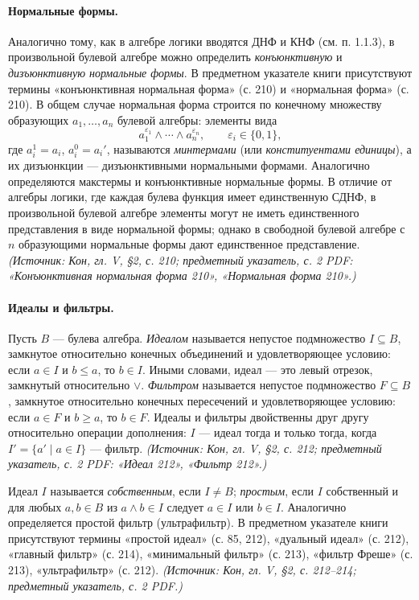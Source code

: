 \documentclass[a4paper,12pt]{article}
\begin{document}
\paragraph{Нормальные формы.}
Аналогично тому, как в алгебре логики вводятся ДНФ и КНФ (см. п. 1.1.3), в произвольной булевой алгебре можно определить \emph{конъюнктивную} и \emph{дизъюнктивную нормальные формы}. В предметном указателе книги присутствуют термины «конъюнктивная нормальная форма» (с. 210) и «нормальная форма» (с. 210). В общем случае нормальная форма строится по конечному множеству образующих \(a_1,\ldots,a_n\) булевой алгебры: элементы вида
\[
a_1^{\varepsilon_1}\wedge\cdots\wedge a_n^{\varepsilon_n},
\qquad \varepsilon_i\in\{0,1\},
\]
где \(a_i^1=a_i\), \(a_i^0=a_i'\), называются \emph{минтермами} (или \emph{конституентами единицы}), а их дизъюнкции — дизъюнктивными нормальными формами. Аналогично определяются макстермы и конъюнктивные нормальные формы. В отличие от алгебры логики, где каждая булева функция имеет единственную СДНФ, в произвольной булевой алгебре элементы могут не иметь единственного представления в виде нормальной формы; однако в свободной булевой алгебре с \(n\) образующими нормальные формы дают единственное представление.
\textit{(Источник: Кон, гл. V, §2, с. 210; предметный указатель, с. 2 PDF: «Конъюнктивная нормальная форма 210», «Нормальная форма 210».)}

\paragraph{Идеалы и фильтры.}
Пусть \(B\) — булева алгебра. \emph{Идеалом} называется непустое подмножество \(I\subseteq B\), замкнутое относительно конечных объединений и удовлетворяющее условию: если \(a\in I\) и \(b\le a\), то \(b\in I\). Иными словами, идеал — это левый отрезок, замкнутый относительно \(\vee\). \emph{Фильтром} называется непустое подмножество \(F\subseteq B\), замкнутое относительно конечных пересечений и удовлетворяющее условию: если \(a\in F\) и \(b\ge a\), то \(b\in F\). Идеалы и фильтры двойственны друг другу относительно операции дополнения: \(I\) — идеал тогда и только тогда, когда \(I'=\{a'\mid a\in I\}\) — фильтр.
\textit{(Источник: Кон, гл. V, §2, с. 212; предметный указатель, с. 2 PDF: «Идеал 212», «Фильтр 212».)}

Идеал \(I\) называется \emph{собственным}, если \(I\neq B\); \emph{простым}, если \(I\) собственный и для любых \(a,b\in B\) из \(a\wedge b\in I\) следует \(a\in I\) или \(b\in I\). Аналогично определяется простой фильтр (ультрафильтр). В предметном указателе книги присутствуют термины «простой идеал» (с. 85, 212), «дуальный идеал» (с. 212), «главный фильтр» (с. 214), «минимальный фильтр» (с. 213), «фильтр Фреше» (с. 213), «ультрафильтр» (с. 212).
\textit{(Источник: Кон, гл. V, §2, с. 212--214; предметный указатель, с. 2 PDF.)}
\end{document}
